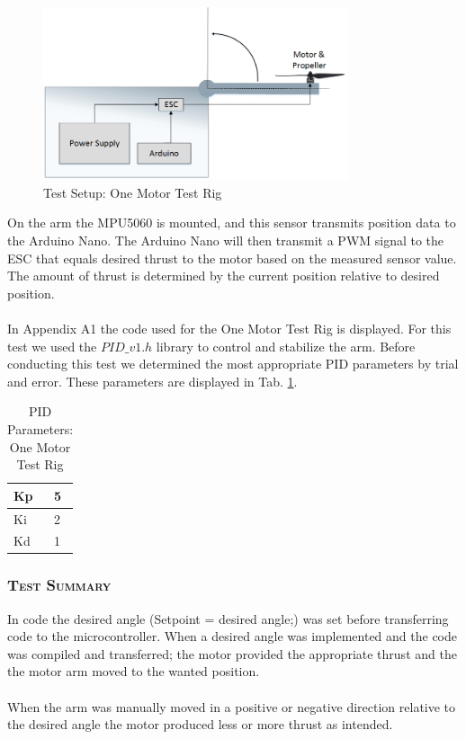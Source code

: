 \begin{figure}[H]
    \centering
    \includegraphics[width = 0.8\textwidth]{VAPIQ-PICTURES/TestSetup1}
    \caption{Test Setup: One Motor Test Rig}
    \label{fig:onemotor}
\end{figure}

\noindent On the arm the MPU5060 is mounted, and this sensor transmits position data to the Arduino Nano. The Arduino Nano will then transmit a PWM signal to the ESC that equals desired thrust to the motor based on the measured sensor value. The amount of thrust is determined by the current position relative to desired position. 
\\\\
In Appendix A1 the code used for the One Motor Test Rig is displayed. For this test we used the $PID\_v1.h$ library to control and stabilize the arm. Before conducting this test we determined the most appropriate PID parameters by trial and error. These parameters are displayed in Tab. \ref{tab:tabt2}.
\begin {table}[H]
    \begin{center}
    \caption {PID Parameters: One Motor Test Rig} 
    \label{tab:tabt2} 
    \begin{tabular}{|l|l|}\hline 
        Kp         & 5  \\ \hline
        Ki         & 2   \\ \hline
        Kd         & 1  \\ \hline
    \end{tabular}
    \end{center}
\end{table}

\subsubsection*{\textsc{\medium Test Summary}}
\noindent
In code the desired angle (Setpoint = desired angle;) was set before transferring code to the microcontroller. When a desired angle was implemented and the code was compiled and transferred; the motor provided the appropriate thrust and the the motor arm moved to the wanted position. 
\\\\
When the arm was manually moved in a positive or negative direction relative to the desired angle the motor produced less or more thrust as intended.

